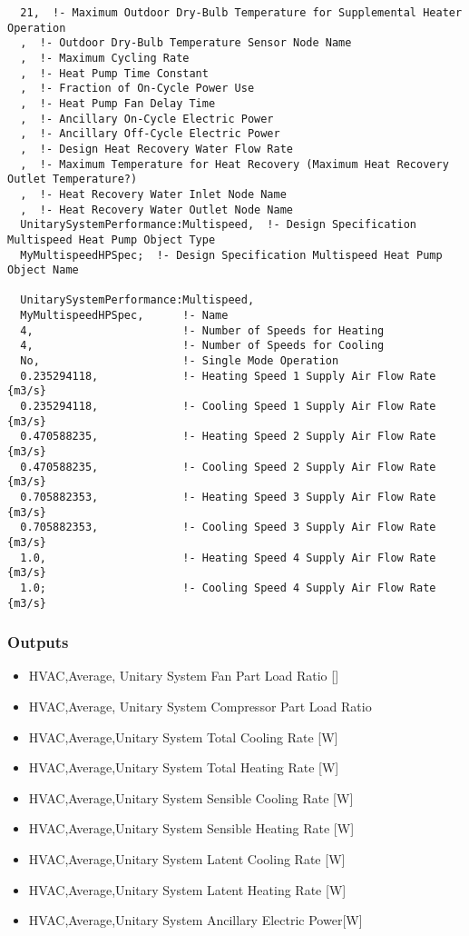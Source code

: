 \begin{lstlisting}
  21,  !- Maximum Outdoor Dry-Bulb Temperature for Supplemental Heater Operation
  ,  !- Outdoor Dry-Bulb Temperature Sensor Node Name
  ,  !- Maximum Cycling Rate
  ,  !- Heat Pump Time Constant
  ,  !- Fraction of On-Cycle Power Use
  ,  !- Heat Pump Fan Delay Time
  ,  !- Ancillary On-Cycle Electric Power
  ,  !- Ancillary Off-Cycle Electric Power
  ,  !- Design Heat Recovery Water Flow Rate
  ,  !- Maximum Temperature for Heat Recovery (Maximum Heat Recovery Outlet Temperature?)
  ,  !- Heat Recovery Water Inlet Node Name
  ,  !- Heat Recovery Water Outlet Node Name
  UnitarySystemPerformance:Multispeed,  !- Design Specification Multispeed Heat Pump Object Type
  MyMultispeedHPSpec;  !- Design Specification Multispeed Heat Pump Object Name

  UnitarySystemPerformance:Multispeed,
  MyMultispeedHPSpec,      !- Name
  4,                       !- Number of Speeds for Heating
  4,                       !- Number of Speeds for Cooling
  No,                      !- Single Mode Operation
  0.235294118,             !- Heating Speed 1 Supply Air Flow Rate {m3/s}
  0.235294118,             !- Cooling Speed 1 Supply Air Flow Rate {m3/s}
  0.470588235,             !- Heating Speed 2 Supply Air Flow Rate {m3/s}
  0.470588235,             !- Cooling Speed 2 Supply Air Flow Rate {m3/s}
  0.705882353,             !- Heating Speed 3 Supply Air Flow Rate {m3/s}
  0.705882353,             !- Cooling Speed 3 Supply Air Flow Rate {m3/s}
  1.0,                     !- Heating Speed 4 Supply Air Flow Rate {m3/s}
  1.0;                     !- Cooling Speed 4 Supply Air Flow Rate {m3/s}
\end{lstlisting}

\subsubsection{Outputs}\label{outputs-038}

\begin{itemize}
\item
  HVAC,Average, Unitary System Fan Part Load Ratio {[]}
\item
  HVAC,Average, Unitary System Compressor Part Load Ratio
\item
  HVAC,Average,Unitary System Total Cooling Rate {[}W{]}
\item
  HVAC,Average,Unitary System Total Heating Rate {[}W{]}
\item
  HVAC,Average,Unitary System Sensible Cooling Rate {[}W{]}
\item
  HVAC,Average,Unitary System Sensible Heating Rate {[}W{]}
\item
  HVAC,Average,Unitary System Latent Cooling Rate {[}W{]}
\item
  HVAC,Average,Unitary System Latent Heating Rate {[}W{]}
\item
  HVAC,Average,Unitary System Ancillary Electric Power{[}W{]}
\end{itemize}

